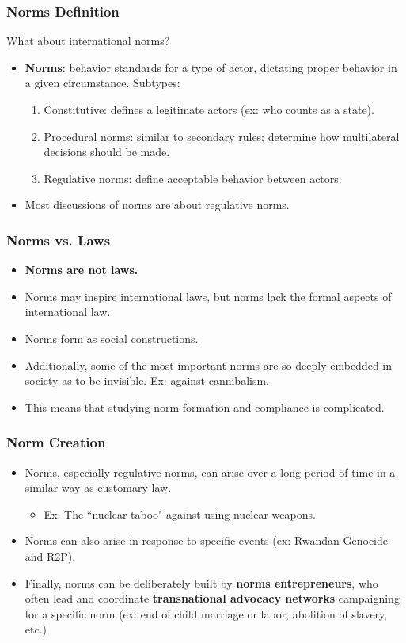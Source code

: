 \documentclass[handout]{beamer}
\begin{document}
\begin{frame} 
	\frametitle{\LARGE{Norms Definition}}
	What about international norms? \pause
	\begin{itemize}
		\item \textbf{Norms}: behavior standards for a type of actor, dictating proper behavior in a given circumstance. \pause Subtypes:
		\begin{enumerate}
			\item Constitutive: defines a legitimate actors (ex: who counts as a state). \pause
			\item Procedural norms: similar to secondary rules; determine how multilateral decisions should be made. \pause
			\item Regulative norms: define acceptable behavior between actors. \pause
		\end{enumerate}
	\item Most discussions of norms are about regulative norms.
	\end{itemize}
\end{frame}

\begin{frame} 
	\frametitle{\LARGE{Norms vs. Laws}}
	\begin{itemize}
		\item \textbf{Norms are not laws.} \pause
		\item Norms may inspire international laws, but norms lack the formal aspects of international law. \pause
		\item Norms form as social constructions. \pause
		\item Additionally, some of the most important norms are so deeply embedded in society as to be invisible. \pause Ex: against cannibalism. \pause
		\item This means that studying norm formation and compliance is complicated.		
	\end{itemize}
\end{frame}

\begin{frame} 
	\frametitle{\LARGE{Norm Creation}}
	\begin{itemize}
		\item Norms, especially regulative norms, can arise over a long period of time in a similar way as customary law. \pause
		\begin{itemize}
			\item Ex: The ``nuclear taboo" against using nuclear weapons.
		\end{itemize}
		\item Norms can also arise in response to specific events (ex: Rwandan Genocide and R2P).
		\item Finally, norms can be deliberately built by \textbf{norms entrepreneurs}, who often lead and coordinate \textbf{transnational advocacy networks} campaigning for a specific norm (ex: end of child marriage or labor, abolition of slavery, etc.)
	\end{itemize}
\end{frame}
\end{document}
